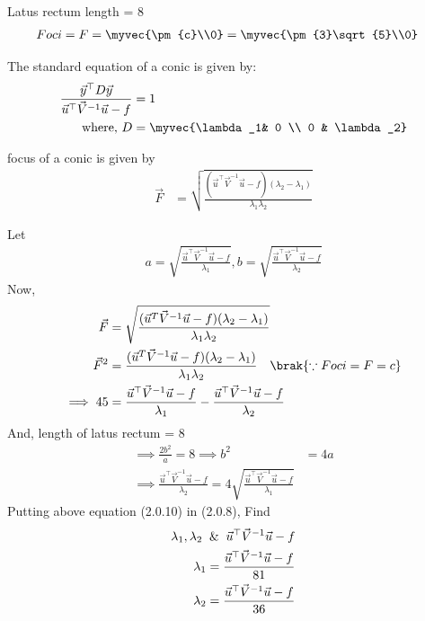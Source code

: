 \documentclass[journal,12pt,twocolumn]{IEEEtran}
\begin{document}
Latus rectum length = 8 
\begin{align}
Foci=F=\myvec{\pm{c}\\0} &=\myvec{\pm{3}\sqrt{5}\\0}
\end{align}
\begin{lemma}
The standard equation of a conic is given by:
\begin{align}
\frac{\vec{y}^{\top}D\vec{y}}{\vec{u}^{\top}\vec{V}^{-1}\vec{u}-f}&=1
\\
\text{where, } D &=\myvec{\lambda_1& 0 \\ 0 & \lambda_2}
\end{align}
\end{lemma}
\begin{lemma}
focus of a conic is given by
\begin{align}
 \vec{F} &=\sqrt{\frac{ (\vec{u}^{\top} \vec{V}^{-1} \vec{u} - f)(\lambda_2-\lambda_1)}{\lambda_1\lambda_2}}
 \end{align}
\end{lemma}
Let
\begin{align}
  a = \sqrt{\frac{\vec{u}^{\top}\vec{V}^{-1}\vec{u}-f}{\lambda_1}},
  b = \sqrt{\frac{\vec{u}^{\top}\vec{V}^{-1}\vec{u}-f}{\lambda_2}}
\end{align}
Now,
\begin{align}
\vec{F} &= \sqrt{\frac{(\vec{u}^T\vec{V}^{-1}\vec{u}-f)(\lambda_2-\lambda_1)}{\lambda_1\lambda_2}}
 \\
 \vec{F}^2 &= \frac{(\vec{u}^T\vec{V}^{-1}\vec{u}-f)(\lambda_2-\lambda_1)}{\lambda_1\lambda_2}\quad\brak{\because Foci=F=c}
 \\
\implies 45 &= \frac{\vec{u}^{\top}\vec{V}^{-1}\vec{u}-f}{\lambda_1}-\frac{\vec{u}^{\top}\vec{V}^{-1}\vec{u}-f}{\lambda_2}
\end{align}
And,
length of latus rectum = 8 
\begin{align}
\implies\frac{2b^2}{a} = 8 \implies b^2 &= 4a
\\
\implies \frac{\vec{u}^{\top}\vec{V}^{-1}\vec{u}-f}{\lambda_2} = 4\sqrt{\frac{\vec{u}^{\top}\vec{V}^{-1}\vec{u}-f}{\lambda_1}} 
\end{align}
Putting above equation (2.0.10) in (2.0.8), Find
\begin{align}
\lambda_1,\lambda_2 \And {\vec{u}^{\top}\vec{V}^{-1}\vec{u}-f}
\\
\lambda_1=\frac{\vec{u}^{\top}\vec{V}^{-1}\vec{u}-f}{81}
\\
\lambda_2=\frac{\vec{u}^{\top}\vec{V}^{-1}\vec{u}-f}{36}
\end{align}
\end{document}
